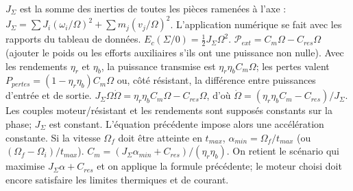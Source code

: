 \begin{corrigebox}
$J_\Sigma$ est la somme des inerties de toutes les pièces ramenées à
                l'axe : $J_\Sigma=\sum J_i(\omega_i/\Omega)^2+
                \sum m_j(v_j/\Omega)^2$. L'application numérique se fait avec les rapports
                du tableau de données.
$E_c(\Sigma/0)=\tfrac12J_\Sigma\Omega^2$.
$\mathcal P_{ext}=C_m\Omega-C_{res}\Omega$ (ajouter le poids ou les
                efforts auxiliaires s'ils ont une puissance non nulle).
Avec les rendements $\eta_r$ et $\eta_b$, la puissance transmise est
                $\eta_r\eta_bC_m\Omega$; les pertes valent
                $P_{pertes}=(1-\eta_r\eta_b)C_m\Omega$ ou, côté résistant, la différence
                entre puissances d'entrée et de sortie.
$J_\Sigma\Omega\dot\Omega=
                \eta_r\eta_bC_m\Omega-C_{res}\Omega$, d'où
                $\boxed{\dot\Omega=(\eta_r\eta_bC_m-C_{res})/J_\Sigma}$.
Les couples moteur/résistant et les rendements sont supposés constants
                sur la phase; $J_\Sigma$ est constant. L'équation précédente impose alors
                une accélération constante.
Si la vitesse $\Omega_f$ doit être atteinte en $t_{max}$,
                $\alpha_{min}=\Omega_f/t_{max}$ (ou
                $(\Omega_f-\Omega_i)/t_{max}$).
$C_m=(J_\Sigma\alpha_{min}+C_{res})/(\eta_r\eta_b)$.
On retient le scénario qui maximise $J_\Sigma\alpha+C_{res}$ et on
                applique la formule précédente; le moteur choisi doit encore satisfaire
                les limites thermiques et de courant.
\end{corrigebox}
